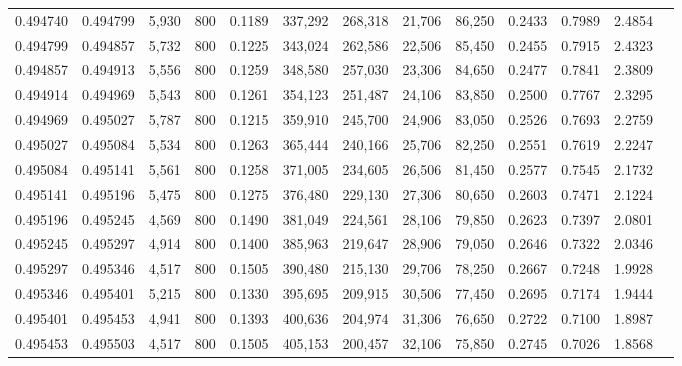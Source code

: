 \begin{tabular}{rrrrrrrrrrrrr}
0.494740 & 0.494799 &  5,930 &   800 &                                     0.1189 & 337,292 & 268,318 &  21,706 &  86,250 & 0.2433 & 0.7989 & 2.4854 \\
0.494799 & 0.494857 &  5,732 &   800 &                                     0.1225 & 343,024 & 262,586 &  22,506 &  85,450 & 0.2455 & 0.7915 & 2.4323 \\
0.494857 & 0.494913 &  5,556 &   800 &                                     0.1259 & 348,580 & 257,030 &  23,306 &  84,650 & 0.2477 & 0.7841 & 2.3809 \\
0.494914 & 0.494969 &  5,543 &   800 &                                     0.1261 & 354,123 & 251,487 &  24,106 &  83,850 & 0.2500 & 0.7767 & 2.3295 \\
0.494969 & 0.495027 &  5,787 &   800 &                                     0.1215 & 359,910 & 245,700 &  24,906 &  83,050 & 0.2526 & 0.7693 & 2.2759 \\
0.495027 & 0.495084 &  5,534 &   800 &                                     0.1263 & 365,444 & 240,166 &  25,706 &  82,250 & 0.2551 & 0.7619 & 2.2247 \\
0.495084 & 0.495141 &  5,561 &   800 &                                     0.1258 & 371,005 & 234,605 &  26,506 &  81,450 & 0.2577 & 0.7545 & 2.1732 \\
0.495141 & 0.495196 &  5,475 &   800 &                                     0.1275 & 376,480 & 229,130 &  27,306 &  80,650 & 0.2603 & 0.7471 & 2.1224 \\
0.495196 & 0.495245 &  4,569 &   800 &                                     0.1490 & 381,049 & 224,561 &  28,106 &  79,850 & 0.2623 & 0.7397 & 2.0801 \\
0.495245 & 0.495297 &  4,914 &   800 &                                     0.1400 & 385,963 & 219,647 &  28,906 &  79,050 & 0.2646 & 0.7322 & 2.0346 \\
0.495297 & 0.495346 &  4,517 &   800 &                                     0.1505 & 390,480 & 215,130 &  29,706 &  78,250 & 0.2667 & 0.7248 & 1.9928 \\
0.495346 & 0.495401 &  5,215 &   800 &                                     0.1330 & 395,695 & 209,915 &  30,506 &  77,450 & 0.2695 & 0.7174 & 1.9444 \\
0.495401 & 0.495453 &  4,941 &   800 &                                     0.1393 & 400,636 & 204,974 &  31,306 &  76,650 & 0.2722 & 0.7100 & 1.8987 \\
0.495453 & 0.495503 &  4,517 &   800 &                                     0.1505 & 405,153 & 200,457 &  32,106 &  75,850 & 0.2745 & 0.7026 & 1.8568 \\

\end{tabular}
